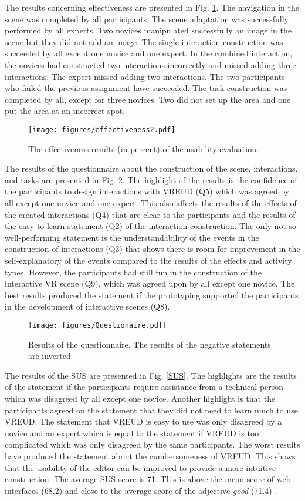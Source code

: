 \documentclass[conference]{IEEEtran}
\begin{document}
The results concerning effectiveness are presented in Fig. \ref{effectiveness}. The navigation in the scene was completed by all participants. The scene adaptation was successfully performed by all experts. Two novices manipulated successfully an image in the scene but they did not add an image. The single interaction construction was succeeded by all except one novice and one expert. In the combined interaction, the novices had constructed two interactions incorrectly and missed adding three interactions. The expert missed adding two interactions. The two participants who failed the previous assignment have succeeded. The task construction was completed by all, except for three novices. Two did not set up the area and one put the area at an incorrect spot.
\begin{figure}[htbp]
\centerline{\texttt{[image: figures/effectiveness2.pdf]}}
\caption{The effectiveness results (in percent) of the usability evaluation.}
\label{effectiveness}
\end{figure}
The results of the questionnaire about the construction of the scene, interactions, and tasks are presented in Fig. \ref{questionnaire}. The highlight of the results is the confidence of the participants to design interactions with VREUD (Q5) which was agreed by all except one novice and one expert. This also affects the results of the effects of the created interactions (Q4) that are clear to the participants and the results of the easy-to-learn statement (Q2) of the interaction construction. The only not so well-performing statement is the understandability of the events in the construction of interactions (Q3) that shows there is room for improvement in the self-explanatory of the events compared to the results of the effects and activity types. However, the participants had still fun in the construction of the interactive VR scene (Q9), which was agreed upon by all except one novice. The best results produced the statement if the prototyping supported the participants in the development of interactive scenes (Q8).

\begin{figure}[htbp]
\centerline{\texttt{[image: figures/Questionaire.pdf]}}
\caption{Results of the questionnaire. The results of the negative statements are inverted}
\label{questionnaire}
\end{figure}


The results of the \ac{SUS} are presented in Fig. \ref{SUS}. The highlights are the results of the statement if the participants require assistance from a technical person which was disagreed by all except one novice. Another highlight is that the participants agreed on the statement that they did not need to learn much to use VREUD. The statement that VREUD is easy to use was only disagreed by a novice and an expert which is equal to the statement if VREUD is too complicated which was only disagreed by the same participants. The worst results have produced the statement about the cumbersomeness of VREUD. This shows that the usability of the editor can be improved to provide a more intuitive construction. The average SUS score is 71. This is above the mean score of web interfaces (68.2) and close to the average score of the adjective \textit{good} (71.4) \cite{SUS-Score-Int}.
\end{document}
